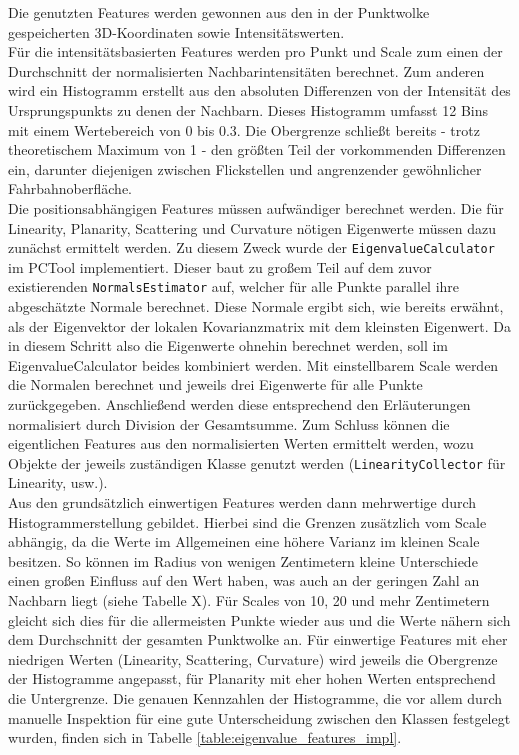 Die genutzten Features werden gewonnen aus den in der Punktwolke gespeicherten 3D-Koordinaten sowie Intensitätswerten. \\
Für die intensitätsbasierten Features werden pro Punkt und Scale zum einen der Durchschnitt der normalisierten Nachbarintensitäten berechnet. Zum anderen wird ein Histogramm erstellt aus den absoluten Differenzen von der Intensität des Ursprungspunkts zu denen der Nachbarn. Dieses Histogramm umfasst 12 Bins mit einem Wertebereich von 0 bis 0.3. Die Obergrenze schließt bereits - trotz theoretischem Maximum von 1 - den größten Teil der vorkommenden Differenzen ein, darunter diejenigen zwischen Flickstellen und angrenzender gewöhnlicher Fahrbahnoberfläche. \\
Die positionsabhängigen Features müssen aufwändiger berechnet werden. Die für Linearity, Planarity, Scattering und Curvature nötigen Eigenwerte müssen dazu zunächst ermittelt werden. Zu diesem Zweck wurde der \texttt{EigenvalueCalculator} im PCTool implementiert.  Dieser baut zu großem Teil auf dem zuvor existierenden \texttt{NormalsEstimator} auf, welcher für alle Punkte parallel ihre abgeschätzte Normale berechnet. Diese Normale ergibt sich, wie bereits erwähnt, als der Eigenvektor der lokalen Kovarianzmatrix mit dem kleinsten Eigenwert. Da in diesem Schritt also die Eigenwerte ohnehin berechnet werden, soll im EigenvalueCalculator beides kombiniert werden. Mit einstellbarem Scale werden die Normalen berechnet und jeweils drei Eigenwerte für alle Punkte zurückgegeben. Anschließend werden diese entsprechend den Erläuterungen normalisiert durch Division der Gesamtsumme. Zum Schluss können die eigentlichen Features aus den normalisierten Werten ermittelt werden, wozu Objekte der jeweils zuständigen Klasse genutzt werden (\texttt{LinearityCollector} für Linearity, usw.). \\
Aus den grundsätzlich einwertigen Features werden dann mehrwertige durch Histogrammerstellung gebildet. Hierbei sind die Grenzen zusätzlich vom Scale abhängig, da die Werte im Allgemeinen eine höhere Varianz im kleinen Scale besitzen. So können im Radius von wenigen Zentimetern kleine Unterschiede einen großen Einfluss auf den Wert haben, was auch an der geringen Zahl an Nachbarn liegt (siehe Tabelle X). Für Scales von 10, 20 und mehr Zentimetern gleicht sich dies für die allermeisten Punkte wieder aus und die Werte nähern sich dem Durchschnitt der gesamten Punktwolke an. Für einwertige Features mit eher niedrigen Werten (Linearity, Scattering, Curvature) wird jeweils die Obergrenze der Histogramme angepasst, für Planarity mit eher hohen Werten entsprechend die Untergrenze. Die genauen Kennzahlen der Histogramme, die vor allem durch manuelle Inspektion für eine gute Unterscheidung zwischen den Klassen festgelegt wurden, finden sich in Tabelle \ref{table:eigenvalue_features_impl}.

